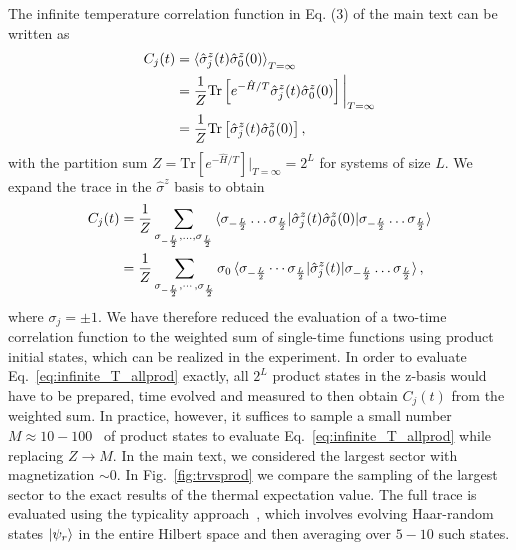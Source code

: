 \documentclass[aps,10pt,reprint,groupedaddress,superscriptaddress]{revtex4-2}
\begin{document}
The infinite temperature correlation function in Eq. (3) of the main text can be written as
\begin{align}
    C_j(t)&=\braket{\hat \sigma^z_j(t) \hat \sigma^z_0 (0)}_{T=\infty}\\ &=     \frac{1}{Z} \mathrm{Tr} \left[e^{- \hat H/T}\hat \sigma^z_j(t) \hat \sigma^z_0 (0) \right]\bigg|_{T=\infty}\\ &=     \frac{1}{Z} \mathrm{Tr} \left[\hat \sigma^z_j(t) \hat \sigma^z_0 (0) \right],
\end{align}
with the partition sum $Z=\mathrm{Tr}[e^{- \hat H/T}]|_{T=\infty}=2^L$ for systems of size $L$. We expand the trace in the $\hat \sigma^z$ basis to obtain
\begin{align}
    C_j(t)&= \frac{1}{Z} \sum_{ \sigma_{-\frac{L}{2}}, \dots, \sigma_{\frac{L}{2}}} \braket{\sigma_{-\frac{L}{2}}\dots\sigma_{\frac{L}{2}}|\hat\sigma^z_j(t) \hat \sigma^z_0 (0)|\sigma_{-\frac{L}{2}}\dots\sigma_{\frac{L}{2}}}\\
    &=\frac{1}{Z} \sum_{ \sigma_{-\frac{L}{2}}, \cdots, \sigma_{\frac{L}{2}}} \sigma_0 \braket{\sigma_{-\frac{L}{2}}\cdots\sigma_{\frac{L}{2}}|\hat\sigma^z_j(t) |\sigma_{-\frac{L}{2}}\dots\sigma_{\frac{L}{2}}} \label{eq:infinite_T_allprod} ,
\end{align}
where $\sigma_j = \pm 1$. We have therefore reduced the evaluation of a two-time correlation function to the weighted sum of single-time functions using product initial states, which can be realized in the experiment. In order to evaluate Eq.~\eqref{eq:infinite_T_allprod} exactly, all $2^L$ product states in the z-basis would have to be prepared, time evolved and measured to then obtain $C_j(t)$ from the weighted sum. In practice, however, it suffices to sample a small number $M\approx 10-100$~\cite{PhysRevB.101.020416} of product states to evaluate Eq.~\eqref{eq:infinite_T_allprod} while replacing $Z\rightarrow M$. %
In the main text, we considered the largest sector with magnetization $\sim 0$. In Fig.~\ref{fig:trvsprod} we compare the sampling of the largest sector to the exact results of the thermal expectation value. The full trace is evaluated using the typicality approach~\cite{PhysRevLett.102.110403}, which involves evolving Haar-random states $\ket{\psi_r}$ in the entire Hilbert space and then averaging over $5-10$ such states.  %
\end{document}
